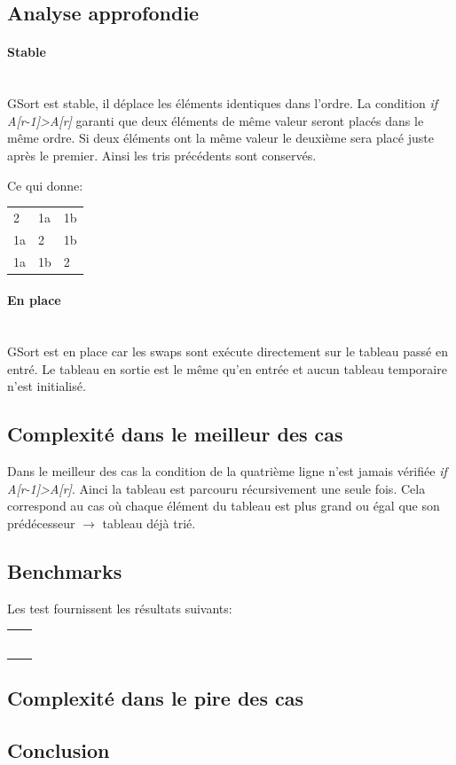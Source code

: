 \documentclass[11pt]{article}
\begin{document}
\subsection{Analyse approfondie}
\paragraph{Stable}~\\
GSort est stable, il déplace les éléments identiques dans l'ordre. La condition \emph{if A[r-1]>A[r]} garanti que deux éléments de même valeur seront placés dans le même ordre. Si deux éléments ont la même valeur le deuxième sera placé juste après le premier. Ainsi les tris précédents sont conservés.

Ce qui donne:

\begin{tabular}{lll}
   2 & 1a & 1b \\
   1a & 2 & 1b \\
   1a & 1b & 2 \\
\end{tabular}
\paragraph{En place}~\\
GSort est en place car les swaps sont exécute directement sur le tableau passé en entré. Le tableau en sortie est le même qu'en entrée et aucun tableau temporaire n'est initialisé.
\subsection{Complexité dans le meilleur des cas}
Dans le meilleur des cas la condition de la quatrième ligne n'est jamais vérifiée \emph{if A[r-1]>A[r]}. Ainci la tableau est parcouru récursivement une seule fois. Cela correspond au cas où chaque élément du tableau est plus grand ou égal que son prédécesseur $\rightarrow$ tableau déjà trié.
\subsection{Benchmarks}
Les test fournissent les résultats suivants:

\begin{table}[]
\centering
\label{my-label}
\begin{tabular}{ll}
 &  \\
 &  \\
 &  \\
 &  \\
 &  \\
 & 
\end{tabular}
\end{table}
\subsection{Complexité dans le pire des cas}

\subsection{Conclusion}
\end{document}
